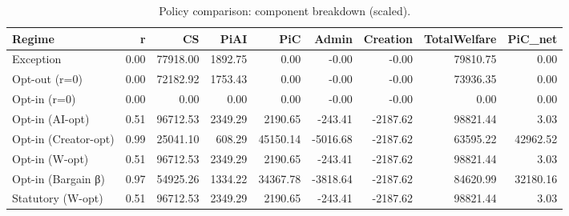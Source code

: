 \begin{table}[!ht]
\centering
\caption{Policy comparison: component breakdown (scaled).}
\label{tab:comparison_components}
\begin{tabular}{lrrrrrrrr}
\toprule
Regime & r & CS & PiAI & PiC & Admin & Creation & TotalWelfare & PiC_net \\
\midrule
Exception & 0.00 & 77918.00 & 1892.75 & 0.00 & -0.00 & -0.00 & 79810.75 & 0.00 \\
Opt-out (r=0) & 0.00 & 72182.92 & 1753.43 & 0.00 & -0.00 & -0.00 & 73936.35 & 0.00 \\
Opt-in (r=0) & 0.00 & 0.00 & 0.00 & 0.00 & -0.00 & -0.00 & 0.00 & 0.00 \\
Opt-in (AI-opt) & 0.51 & 96712.53 & 2349.29 & 2190.65 & -243.41 & -2187.62 & 98821.44 & 3.03 \\
Opt-in (Creator-opt) & 0.99 & 25041.10 & 608.29 & 45150.14 & -5016.68 & -2187.62 & 63595.22 & 42962.52 \\
Opt-in (W-opt) & 0.51 & 96712.53 & 2349.29 & 2190.65 & -243.41 & -2187.62 & 98821.44 & 3.03 \\
Opt-in (Bargain β) & 0.97 & 54925.26 & 1334.22 & 34367.78 & -3818.64 & -2187.62 & 84620.99 & 32180.16 \\
Statutory (W-opt) & 0.51 & 96712.53 & 2349.29 & 2190.65 & -243.41 & -2187.62 & 98821.44 & 3.03 \\
\bottomrule
\end{tabular}

\end{table}